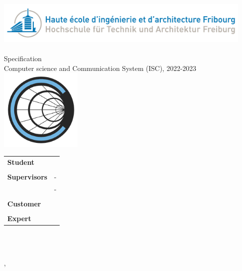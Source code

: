 
\begin{titlepage}
	{\selectfont
		\begin{center}
			\includegraphics[width=0.95\textwidth]{05-resources/img/heiafr_logo}
			~\\[1.5cm]
			{
				\Huge
				\ThesisTitle\\Specification \\[0.5cm]
				\large Computer science and Communication System (ISC), 2022-2023\\[2cm]
			}
			\includegraphics[width=0.30\textwidth]{05-resources/img/logo.png}
			~\\[2cm]
			{
				\begin{center}
				\begin{tabularx}{\textwidth} { %
					>{\raggedright\arraybackslash}X
					>{\raggedright\arraybackslash}X  }
						 \textbf{Student} & \Author\\
						 & \\
						 \textbf{Supervisors} & \Advisor \space - \AdvisorSchool \\ & \AdvisorTwo \space - \AdvisorTwoSchool \\
						 & \\
						 \textbf{Customer} & \Mendant\\
						 & \\
						 \textbf{Expert} & \Expert\\
				\end{tabularx}
				\end{center}
				~\\[1.5cm]
			}

			\vfill



			{\specificationVersion}\\
			{\large \Place, \Date}

		\end{center}
	}
	\restoregeometry
	\end{titlepage}




